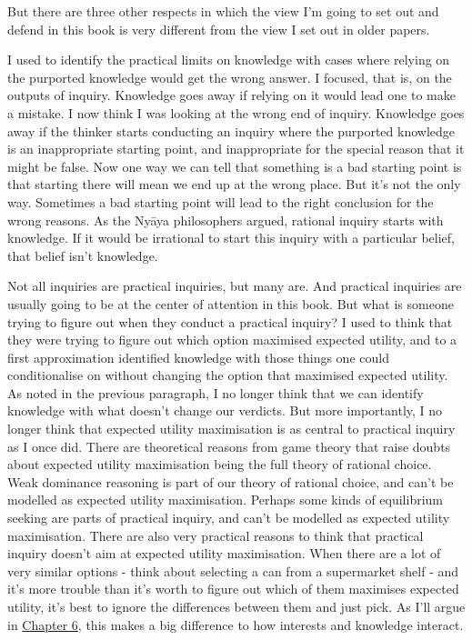 \documentclass[
  10pt,
  letterpaper,
  twoside]{scrbook}
\begin{document}
But there are three other respects in which the view I'm going to set
out and defend in this book is very different from the view I set out in
older papers.

I used to identify the practical limits on knowledge with cases where
relying on the purported knowledge would get the wrong answer. I
focused, that is, on the outputs of inquiry. Knowledge goes away if
relying on it would lead one to make a mistake. I now think I was
looking at the wrong end of inquiry. Knowledge goes away if the thinker
starts conducting an inquiry where the purported knowledge is an
inappropriate starting point, and inappropriate for the special reason
that it might be false. Now one way we can tell that something is a bad
starting point is that starting there will mean we end up at the wrong
place. But it's not the only way. Sometimes a bad starting point will
lead to the right conclusion for the wrong reasons. As the Nyāya
philosophers argued, rational inquiry starts with knowledge. If it would
be irrational to start this inquiry with a particular belief, that
belief isn't knowledge.

Not all inquiries are practical inquiries, but many are. And practical
inquiries are usually going to be at the center of attention in this
book. But what is someone trying to figure out when they conduct a
practical inquiry? I used to think that they were trying to figure out
which option maximised expected utility, and to a first approximation
identified knowledge with those things one could conditionalise on
without changing the option that maximised expected utility. As noted in
the previous paragraph, I no longer think that we can identify knowledge
with what doesn't change our verdicts. But more importantly, I no longer
think that expected utility maximisation is as central to practical
inquiry as I once did. There are theoretical reasons from game theory
that raise doubts about expected utility maximisation being the full
theory of rational choice. Weak dominance reasoning is part of our
theory of rational choice, and can't be modelled as expected utility
maximisation. Perhaps some kinds of equilibrium seeking are parts of
practical inquiry, and can't be modelled as expected utility
maximisation. There are also very practical reasons to think that
practical inquiry doesn't aim at expected utility maximisation. When
there are a lot of very similar options - think about selecting a can
from a supermarket shelf - and it's more trouble than it's worth to
figure out which of them maximises expected utility, it's best to ignore
the differences between them and just pick. As I'll argue in
\hyperref[sec-ties]{Chapter 6}, this makes a big difference to how
interests and knowledge interact.
\end{document}
